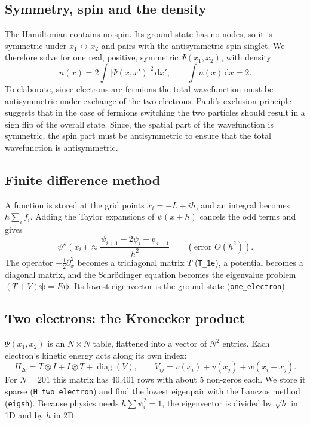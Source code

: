 \documentclass[11pt,a4paper]{article}
\newcommand{\dd}{\,\mathrm{d}}
\begin{document}
\subsection{Symmetry, spin and the density}

The Hamiltonian contains no spin. Its ground state has no nodes, so it is symmetric under
$x_1\leftrightarrow x_2$ and pairs with the antisymmetric spin singlet. We therefore solve for one real, positive,
symmetric $\Psi(x_1,x_2)$, with density
\begin{equation}
  n(x)=2\int|\Psi(x,x')|^2\dd x',\qquad \int n(x)\dd x=2.
\end{equation}
To elaborate, since electrons are fermions the total wavefunction must be antisymmetric under exchange of the two electrons. 
Pauli's exclusion principle suggests that in the case of fermions switching the two particles should result in a sign flip of the overall state. Since, the spatial part
of the wavefunction is symmetric, the spin part must be antisymmetric to ensure that the total wavefunction is antisymmetric.

\subsection{Finite difference method}

A function is stored at the grid points $x_i=-L+ih$, and an integral becomes $h\sum_i f_i$. Adding the
Taylor expansions of $\psi(x\pm h)$ cancels the odd terms and gives
\begin{equation}
  \psi''(x_i)\approx\frac{\psi_{i+1}-2\psi_i+\psi_{i-1}}{h^2}\qquad(\text{error }O(h^2)).
\end{equation}
The operator $-\tfrac12\partial_x^2$ becomes a tridiagonal matrix $T$ (\texttt{T\_1e}), a potential becomes a diagonal
matrix, and the Schr\"odinger equation becomes the eigenvalue problem $(T+V)\boldsymbol\psi=E\boldsymbol\psi$. Its lowest
eigenvector is the ground state (\texttt{one\_electron}).

\subsection{Two electrons: the Kronecker product}

$\Psi(x_1,x_2)$ is an $N\times N$ table, flattened into a vector of $N^2$ entries. Each electron's kinetic energy acts
along its own index:
\begin{equation}
  H_{2e}=T\otimes I+I\otimes T+\operatorname{diag}(V),\qquad V_{ij}=v(x_i)+v(x_j)+w(x_i-x_j).
\end{equation}
For $N=201$ this matrix has 40{,}401 rows with about 5 non-zeros each. We store it sparse
(\texttt{H\_two\_electron}) and find the lowest eigenpair with the Lanczos method (\texttt{eigsh}). Because physics
needs $h\sum\psi_i^2=1$, the eigenvector is divided by $\sqrt h$ in 1D and by $h$ in 2D.
\end{document}
